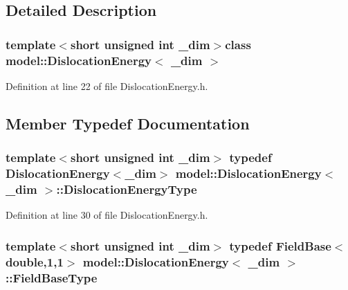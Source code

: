 \subsection{Detailed Description}
\subsubsection*{template$<$short unsigned int \+\_\+dim$>$class model\+::\+Dislocation\+Energy$<$ \+\_\+dim $>$}



Definition at line 22 of file Dislocation\+Energy.\+h.



\subsection{Member Typedef Documentation}
\hypertarget{classmodel_1_1_dislocation_energy_a8216800b4c91c557e11de7978015d1d8}{}
\subsubsection[{Dislocation\+Energy\+Type}]{\setlength{\rightskip}{0pt plus 5cm}template$<$short unsigned int \+\_\+dim$>$ typedef {\bf Dislocation\+Energy}$<$\+\_\+dim$>$ {\bf model\+::\+Dislocation\+Energy}$<$ \+\_\+dim $>$\+::{\bf Dislocation\+Energy\+Type}}\label{classmodel_1_1_dislocation_energy_a8216800b4c91c557e11de7978015d1d8}


Definition at line 30 of file Dislocation\+Energy.\+h.

\hypertarget{classmodel_1_1_dislocation_energy_accde9d41283a093975013ee9b144fced}{}
\subsubsection[{Field\+Base\+Type}]{\setlength{\rightskip}{0pt plus 5cm}template$<$short unsigned int \+\_\+dim$>$ typedef {\bf Field\+Base}$<$double,1,1$>$ {\bf model\+::\+Dislocation\+Energy}$<$ \+\_\+dim $>$\+::{\bf Field\+Base\+Type}}\label{classmodel_1_1_dislocation_energy_accde9d41283a093975013ee9b144fced}


